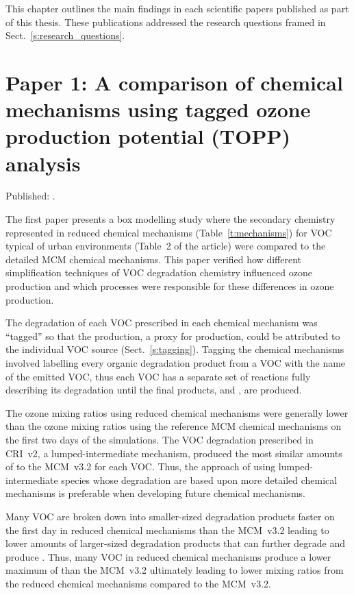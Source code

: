 This chapter outlines the main findings in each scientific papers published as part of this thesis.
These publications addressed the research questions framed in Sect.~\ref{s:research_questions}.


\singlespacing
\section[Paper 1]{Paper 1: A comparison of chemical mechanisms using tagged ozone production potential (TOPP) analysis} \label{s:chemical_mechanism_results}
\onehalfspacing

Published: .
\vspace{5mm}

The first paper presents a box modelling study where the secondary chemistry represented in reduced chemical mechanisms (Table~\ref{t:mechanisms}) for VOC typical of urban environments (Table~2 of the article) were compared to the detailed MCM chemical mechanisms.
This paper verified how different simplification techniques of VOC degradation chemistry influenced ozone production and which processes were responsible for these differences in ozone production.

The degradation of each VOC prescribed in each chemical mechanism was ``tagged'' so that the  production, a proxy for  production, could be attributed to the individual VOC source (Sect.~\ref{s:tagging}).
Tagging the chemical mechanisms involved labelling every organic degradation product from a VOC with the name of the emitted VOC, thus each VOC has a separate set of reactions fully describing its degradation until the final products,  and , are produced.

The ozone mixing ratios using reduced chemical mechanisms were generally lower than the ozone mixing ratios using the reference MCM chemical mechanisms on the first two days of the simulations.
The VOC degradation prescribed in CRI~v2, a lumped-intermediate mechanism, produced the most similar amounts of  to the MCM~v3.2 for each VOC.
Thus, the approach of using lumped-intermediate species whose degradation are based upon more detailed chemical mechanisms is preferable when developing future chemical mechanisms.

Many VOC are broken down into smaller-sized degradation products faster on the first day in reduced chemical mechanisms than the MCM~v3.2 leading to lower amounts of larger-sized degradation products that can further degrade and produce .
Thus, many VOC in reduced chemical mechanisms produce a lower maximum of  than the MCM~v3.2 ultimately leading to lower  mixing ratios from the reduced chemical mechanisms compared to the MCM~v3.2.

